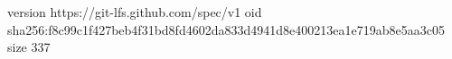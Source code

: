 version https://git-lfs.github.com/spec/v1
oid sha256:f8c99c1f427beb4f31bd8fd4602da833d4941d8e400213ea1e719ab8e5aa3c05
size 337
